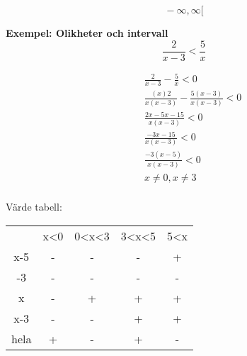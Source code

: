 \begin{multicols}{2}
\begin{equation}
[ \, a, \infty [ \,
\end{equation}
\begin{equation}
] \, -\infty, \infty [ \,
\end{equation}

\textbf{Exempel: Olikheter och intervall}
\begin{equation}
\frac { 2 } { x - 3 } < \frac { 5 } { x }
\end{equation}

\begin{align*}
&\quad \frac{ 2 }{ x - 3 } - \frac{ 5 }{ x } < 0 \\
&\quad \frac{(x) 2 }{x (x - 3)} - \frac{ 5 ( x - 3 )}{ x ( x - 3 ) } < 0 \\
&\quad \frac{ 2 x - 5 x - 15 }{ x ( x - 3 ) } < 0 \\
&\quad \frac{ - 3 x - 15 }{ x ( x - 3 ) } < 0 \\
&\quad \frac{ - 3 ( x - 5 ) }{ x ( x - 3 ) } < 0 \\
&\quad  x \neq 0 , x \neq 3 \\
\end{align*}

Värde tabell:
\begin{center}
\begin{tabular}{ |c|c|c|c|c| } 
 \hline
        & x<0   & 0<x<3 & 3<x<5 & 5<x   \\ 
 x-5    & -     & -     & -     & +     \\ 
 -3     & -     & -     & -     & -     \\  
 x      & -     & +     & +     & +     \\ 
 x-3    & -     & -     & +     & +     \\ 
 hela   & +     & -     & +     & -     \\ 
 \hline
\end{tabular}
\end{center}



\end{multicols}
